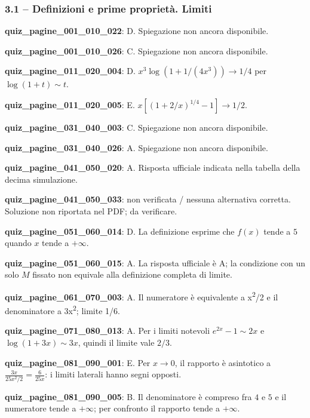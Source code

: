 \documentclass[11pt,a4paper]{article}
\newcounter{quiz}
\begin{document}
\subsubsection*{3.1 -- Definizioni e prime proprietà. Limiti}
\noindent\textbf{quiz\_pagine\_001\_010\_022}: D. Spiegazione non ancora disponibile.\par\medskip
\noindent\textbf{quiz\_pagine\_001\_010\_026}: C. Spiegazione non ancora disponibile.\par\medskip
\noindent\textbf{quiz\_pagine\_011\_020\_004}: D. $x^3\log(1+1/(4x^3))\to1/4$ per $\log(1+t)\sim t$.\par\medskip
\noindent\textbf{quiz\_pagine\_011\_020\_005}: E. $x[(1+2/x)^{1/4}-1]\to 1/2$.\par\medskip
\noindent\textbf{quiz\_pagine\_031\_040\_003}: C. Spiegazione non ancora disponibile.\par\medskip
\noindent\textbf{quiz\_pagine\_031\_040\_026}: A. Spiegazione non ancora disponibile.\par\medskip
\noindent\textbf{quiz\_pagine\_041\_050\_020}: A. Risposta ufficiale indicata nella tabella della decima simulazione.\par\medskip
\noindent\textbf{quiz\_pagine\_041\_050\_033}: non verificata / nessuna alternativa corretta. Soluzione non riportata nel PDF; da verificare.\par\medskip
\noindent\textbf{quiz\_pagine\_051\_060\_014}: D. La definizione esprime che $f(x)$ tende a $5$ quando $x$ tende a $+\infty$.\par\medskip
\noindent\textbf{quiz\_pagine\_051\_060\_015}: A. La risposta ufficiale è A; la condizione con un solo $M$ fissato non equivale alla definizione completa di limite.\par\medskip
\noindent\textbf{quiz\_pagine\_061\_070\_003}: A. Il numeratore è equivalente a x\textsuperscript{2}/2 e il denominatore a 3x\textsuperscript{2}; limite 1/6.\par\medskip
\noindent\textbf{quiz\_pagine\_071\_080\_013}: A. Per i limiti notevoli $e^{2x}-1\sim2x$ e $\log(1+3x)\sim3x$, quindi il limite vale $2/3$.\par\medskip
\noindent\textbf{quiz\_pagine\_081\_090\_001}: E. Per $x\to0$, il rapporto è asintotico a $\frac{3x}{25x^2/2}=\frac{6}{25x}$: i limiti laterali hanno segni opposti.\par\medskip
\noindent\textbf{quiz\_pagine\_081\_090\_005}: B. Il denominatore è compreso fra $4$ e $5$ e il numeratore tende a $+\infty$; per confronto il rapporto tende a $+\infty$.\par\medskip
\end{document}

